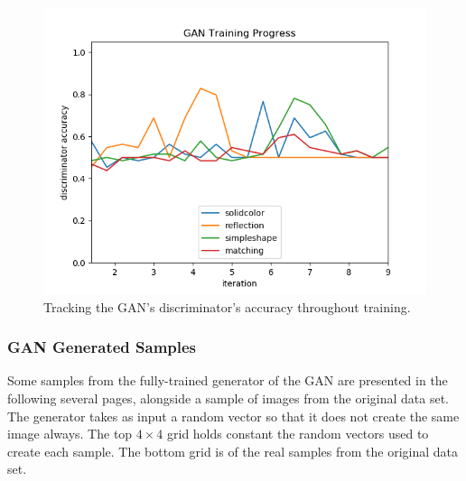 \documentclass{article}
\begin{document}
\begin{figure}[ht]
\label{fig:gan-results}
\centering
\includegraphics[width=\textwidth]{gan-results.png}
\caption{Tracking the GAN's discriminator's accuracy throughout training.}
\end{figure}

\subsubsection{GAN Generated Samples}

Some samples from the fully-trained generator of the GAN are presented in the following several pages, alongside a sample of images from the original data set.
The generator takes as input a random vector so that it does not create the same image always.
The top $4 \times 4$ grid holds constant the random vectors used to create each sample.
The bottom grid is of the real samples from the original data set.
\end{document}
